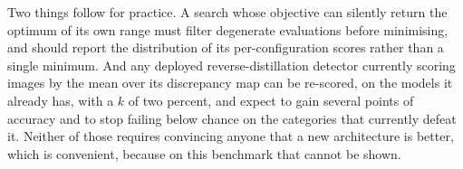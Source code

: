 Two things follow for practice. A search whose objective can silently return the
optimum of its own range must filter degenerate evaluations before minimising, and
should report the distribution of its per-configuration scores rather than a
single minimum. And any deployed reverse-distillation detector currently scoring
images by the mean over its discrepancy map can be re-scored, on the models it
already has, with a $k$ of two percent, and expect to gain several points of
accuracy and to stop failing below chance on the categories that currently defeat
it. Neither of those requires convincing anyone that a new architecture is better,
which is convenient, because on this benchmark that cannot be shown.
